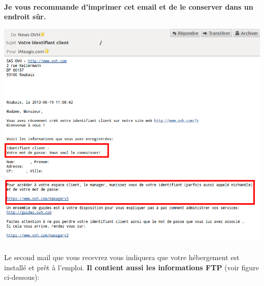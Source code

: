 \documentclass[10pt,a4paper]{article}
\begin{document}
\paragraph{}\begin{center}\textbf{Je vous recommande d'imprimer cet email et de le conserver dans un endroit sûr.}\end{center}
\begin{center}
\includegraphics[scale=0.4]{img/0288.png}
\end{center}
\newpage
\paragraph{}Le second mail que vous recevrez vous indiquera que votre hébergement est installé et prêt à l'emploi. \textbf{Il contient aussi les informations FTP} (voir figure ci-dessous):
\end{document}
